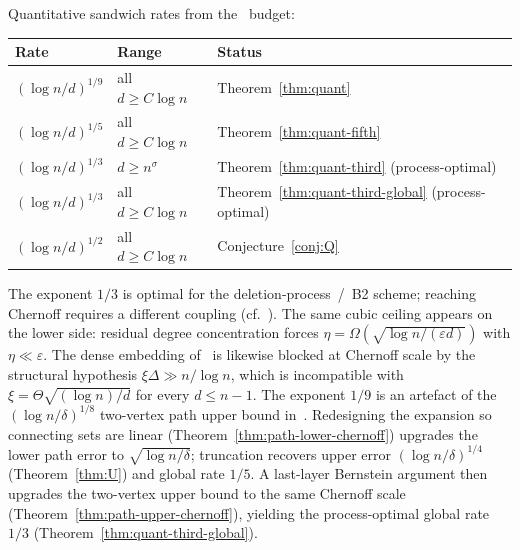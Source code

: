 \documentclass[11pt]{article}
\begin{document}
Quantitative sandwich rates from the~\cite{BIM25} budget:
\begin{center}
\begin{tabular}{lll}
\hline
Rate & Range & Status \\
\hline
\((\log n/d)^{1/9}\) & all \(d\ge C\log n\) & Theorem~\ref{thm:quant} \\
\((\log n/d)^{1/5}\) & all \(d\ge C\log n\) & Theorem~\ref{thm:quant-fifth} \\
\((\log n/d)^{1/3}\) & \(d\ge n^{\sigma}\) & Theorem~\ref{thm:quant-third} (process-optimal) \\
\((\log n/d)^{1/3}\) & all \(d\ge C\log n\) & Theorem~\ref{thm:quant-third-global} (process-optimal) \\
\((\log n/d)^{1/2}\) & all \(d\ge C\log n\) & Conjecture~\ref{conj:Q} \\
\hline
\end{tabular}
\end{center}
The exponent \(1/3\) is optimal for the deletion-process~/~B2 scheme; reaching
Chernoff requires a different coupling (cf.~\cite[Conjecture~1.3]{BIM25}).
The same cubic ceiling appears on the lower side: residual degree concentration
forces \(\eta=\Omega(\sqrt{\log n/(\varepsilon d)})\) with \(\eta\ll\varepsilon\).
The dense embedding of~\cite{GIM22} is likewise blocked at Chernoff scale by the
structural hypothesis \(\xi\Delta\gg n/\log n\), which is incompatible with
\(\xi=\Theta\sqrt{(\log n)/d}\) for every \(d\le n-1\).
The exponent \(1/9\) is an artefact of the
\((\log n/\delta)^{1/8}\) two-vertex path upper bound in~\cite[Lemma~7.1]{BIM25}.
Redesigning the expansion so connecting sets are linear
(Theorem~\ref{thm:path-lower-chernoff}) upgrades the lower path error to
\(\sqrt{\log n/\delta}\); truncation recovers upper error
\((\log n/\delta)^{1/4}\) (Theorem~\ref{thm:U}) and global rate \(1/5\).
A last-layer Bernstein argument then upgrades the two-vertex upper bound to the
same Chernoff scale (Theorem~\ref{thm:path-upper-chernoff}), yielding the
process-optimal global rate \(1/3\) (Theorem~\ref{thm:quant-third-global}).
\end{document}
